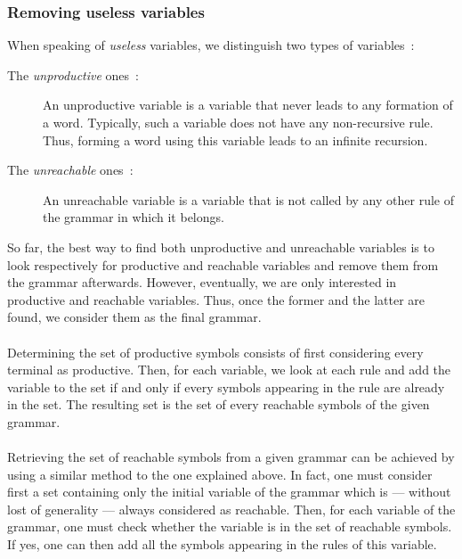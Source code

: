 \documentclass[a4paper,11pt]{article}
\begin{document}
      \subsubsection{Removing useless variables}
        When speaking of \textit{useless} variables, we distinguish two types of variables~:
        \begin{description}
          \item[The \textit{unproductive} ones~:]
            An unproductive variable is a variable that never leads to any formation of a word. Typically, such a variable does not have any non-recursive rule. Thus, forming a word using this variable leads to an infinite recursion.
          \item[The \textit{unreachable} ones~:]
            An unreachable variable is a variable that is not called by any other rule of the grammar in which it belongs.
        \end{description}
        So far, the best way to find both unproductive and unreachable variables is to look respectively for productive and reachable variables and remove them from the grammar afterwards. However, eventually, we are only interested in productive and reachable variables. Thus, once the former and the latter are found, we consider them as the final grammar.\\\\
        Determining the set of productive symbols consists of first considering every terminal as productive. Then, for each variable, we look at each rule and add the variable to the set if and only if every symbols appearing in the rule are already in the set. The resulting set is the set of every reachable symbols of the given grammar.\\\\
        Retrieving the set of reachable symbols from a given grammar can be achieved by using a similar method to the one explained above. In fact, one must consider first a set containing only the initial variable of the grammar which is --- without lost of generality --- always considered as reachable. Then, for each variable of the grammar, one must check whether the variable is in the set of reachable symbols. If yes, one can then add all the symbols appearing in the rules of this variable.
        
\end{document}
